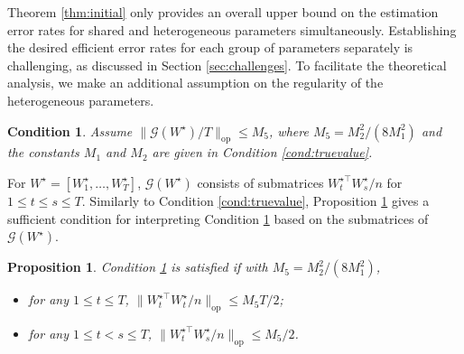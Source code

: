 \documentclass[12pt]{article}
\newcommand{\blue}[1]{\textcolor{blue}{#1}}
\newcommand{\red}[1]{\textcolor{red}{#1}}
\newtheorem{condition}{Condition}
\newtheorem{proposition}{Proposition}
\newcommand{\mytrans}{\top}
\begin{document}


Theorem \ref{thm:initial} only provides an overall upper bound on the estimation error rates  for shared and heterogeneous parameters simultaneously. 
Establishing the desired efficient error rates for each group of parameters separately is challenging, as discussed in Section \ref{sec:challenges}. 
To facilitate the theoretical analysis, 
we make an additional assumption on the regularity of the heterogeneous parameters. 


\begin{condition} \label{cond:truevalue2} 
Assume $\|\mathcal{G} (W^\star) /T \|_{\operatorname{op}} \leqslant M_5$, where $M_5=M_2^2/(8M_1^2)$ and the constants $M_1$ and $M_2$ are given in Condition \ref{cond:truevalue}. 
\end{condition} 


For $W^{\star}=[W_1^{\star},\ldots,W_T^{\star}]$, $\mathcal{G}(W^{\star})$ consists of submatrices $W_t^{\star \top}W_s^\star/n$ for $1\leqslant t\leqslant s\leqslant T$. 
Similarly to Condition \ref{cond:truevalue},  
Proposition \ref{prop:condtion3} gives a sufficient condition for interpreting Condition \ref{cond:truevalue2} based on the submatrices of $\mathcal{G}(W^{\star})$. 

\begin{proposition} \label{prop:condtion3}
Condition \ref{cond:truevalue2} is satisfied if with $M_5=M_2^2/(8M_1^2)$,  

\begin{itemize}\setlength{\itemsep}{0pt}
\item[(a)] for any $1 \leqslant t \leqslant T$, $\|W_t^{\star\top}W_t^{\star}/n\|_{\operatorname{op}} \leqslant M_5T/2$; 

\item[(b)] for any $1 \leqslant t < s \leqslant T$, $\|W_t^{\star\mytrans} W_s^{\star}/n\|_{\operatorname{op}} \leqslant M_5/2$.

\end{itemize}
\end{proposition}
\end{document}
